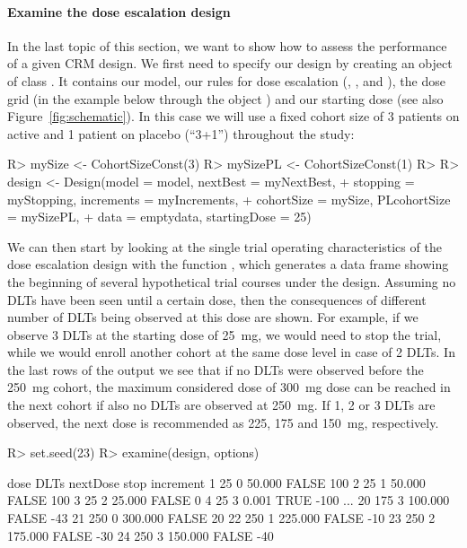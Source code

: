 \documentclass[article]{jss}\usepackage[]{graphicx}\usepackage[]{color}
\begin{document}
\paragraph{Examine the dose escalation design}
In the last topic of this section, we want to show how to assess the performance of a given CRM design. We first need to specify our design by creating an object of class . It contains our model, our rules for dose escalation (, ,  and ), the dose grid (in the example below through the object ) and our starting dose (see also Figure~\ref{fig:schematic}).
In this case we will use a fixed cohort size of 3 patients on active and 1 patient on placebo (``3+1'') throughout the study:
\begin{Schunk}
\begin{Sinput}
R> mySize <- CohortSizeConst(3)
R> mySizePL <- CohortSizeConst(1)
R> 
R> design <- Design(model = model, nextBest = myNextBest, 
+                   stopping = myStopping, increments = myIncrements, 
+                   cohortSize = mySize, PLcohortSize = mySizePL, 
+                   data = emptydata, startingDose = 25)
\end{Sinput}
\end{Schunk}
We can then start by looking at the single trial operating characteristics of the dose escalation design with the function , which generates a data frame showing the beginning of several hypothetical trial courses under the design. Assuming no DLTs have been seen until a certain dose, then the consequences of different number of DLTs being observed at this dose are shown. For example, if we observe 3 DLTs at the starting dose of 25~mg, we would
need to stop the trial, while we would enroll another cohort at the same dose level in case of 2 DLTs. In the last rows of the output we see that if no DLTs were observed before the 250~mg cohort, the maximum considered dose of 300~mg dose can be reached in the next cohort if also no DLTs are observed at 250~mg. If 1, 2 or 3 DLTs are observed, the next dose is recommended as 225, 175 and 150~mg, respectively.  
\begin{Schunk}
\begin{Sinput}
R> set.seed(23)
R> examine(design, options)
\end{Sinput}
\begin{Soutput}
   dose DLTs nextDose  stop increment
1    25    0   50.000 FALSE       100
2    25    1   50.000 FALSE       100
3    25    2   25.000 FALSE         0
4    25    3    0.001  TRUE      -100
...
20  175    3  100.000 FALSE       -43
21  250    0  300.000 FALSE        20
22  250    1  225.000 FALSE       -10
23  250    2  175.000 FALSE       -30
24  250    3  150.000 FALSE       -40
\end{Soutput}
\end{Schunk}
\end{document}
